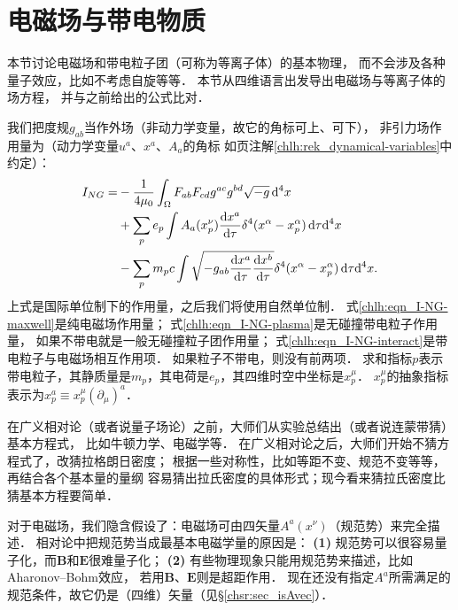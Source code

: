 \section{电磁场与带电物质}\label{chlh:sec_matter-NG}
本节讨论电磁场和带电粒子团（可称为等离子体）的基本物理\parencite[\S 12.1]{weinberg_grav-1972}，
而不会涉及各种量子效应，比如不考虑自旋等等．
本节从四维语言出发导出电磁场与等离子体的场方程，
并与之前给出的公式比对．


我们把度规$g_{ab}$当作外场（非动力学变量，故它的角标可上、可下），
非引力场作用量为（动力学变量$u^a$、$x^a$、$A_a$的角标
如\pageref{chlh:rek_dynamical-variables}页注解\ref{chlh:rek_dynamical-variables}中约定）：
\begin{subequations}\label{chlh:eqn_I-NG}
\begin{align}
    I_{NG} =& -\frac{1}{4\mu_0}\int_\Omega F_{ab} F_{cd} g^{ac}g^{bd} \sqrt{-g}
     \, {\rm d}^{4}x \label{chlh:eqn_I-NG-maxwell} \\
    &+ \sum_{p} e_{p} \int A_{a}(x^\nu_p)
     \frac{{\rm d} x^a}{{\rm d} \tau} \delta^4(x^\alpha-x^\alpha_p)
      \, {\rm d} \tau {\rm d}^{4}x \label{chlh:eqn_I-NG-interact} \\
    &- \sum_{p} m_p c \int \sqrt{-g_{ab} \frac{{\rm d} x^a}{{\rm d} \tau}
         \frac{{\rm d}x^b}{{\rm d} \tau} }\delta^4(x^\alpha-x^\alpha_p)
       \, {\rm d} \tau {\rm d}^{4}x. \label{chlh:eqn_I-NG-plasma}
\end{align}
\end{subequations}
上式是国际单位制下的作用量，之后我们将使用自然单位制．
式\eqref{chlh:eqn_I-NG-maxwell}是纯电磁场作用量；
式\eqref{chlh:eqn_I-NG-plasma}是无碰撞带电粒子作用量，
如果不带电就是一般无碰撞粒子团作用量；
式\eqref{chlh:eqn_I-NG-interact}是带电粒子与电磁场相互作用项．
如果粒子不带电，则没有前两项．
求和指标$p$表示带电粒子，其静质量是$m_p$，其电荷是$e_p$，其四维时空中坐标是$x^\mu_p$．
$x^\mu_p$的抽象指标表示为$x^a_p\equiv x^\mu_p (\partial_\mu)^a$．

在广义相对论（或者说量子场论）之前，大师们从实验总结出（或者说连蒙带猜）基本方程式，
比如牛顿力学、电磁学等．
在广义相对论之后，大师们开始不猜方程式了，改猜拉格朗日密度；
根据一些对称性，比如等距不变、规范不变等等，再结合各个基本量的量纲
容易猜出拉氏密度的具体形式；现今看来猜拉氏密度比猜基本方程要简单．




对于电磁场，我们隐含假设了：电磁场可由四矢量$A^a(x^\nu)$（规范势）来完全描述．
相对论中把规范势当成最基本电磁学量的原因是：
{\bfseries (1)} 规范势可以很容易量子化，而$\boldsymbol{B}$和$\boldsymbol{E}$很难量子化；
{\bfseries (2)} 有些物理现象只能用规范势来描述，比如Aharonov--Bohm效应，
若用$\boldsymbol{B}$、$\boldsymbol{E}$则是超距作用．
现在还没有指定$A^a$所需满足的规范条件，故它仍是（四维）矢量（见\S\ref{chsr:sec_isAvec}）．

